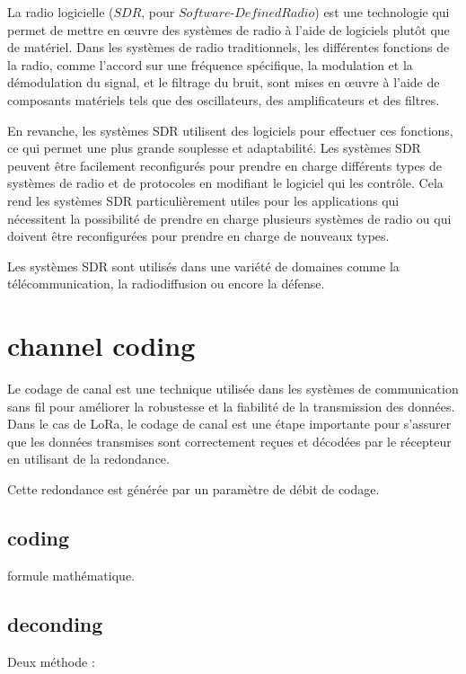 \documentclass[12pt,a4paper,oneside, titlepage]{report}
\begin{document}
La radio logicielle ($SDR$, pour $Software$-$Defined Radio$) est une technologie qui permet de mettre en œuvre des systèmes de radio à l'aide de logiciels plutôt que de matériel. Dans les systèmes de radio traditionnels, les différentes fonctions de la radio, comme l'accord sur une fréquence spécifique, la modulation et la démodulation du signal, et le filtrage du bruit, sont mises en œuvre à l'aide de composants matériels tels que des oscillateurs, des amplificateurs et des filtres.

En revanche, les systèmes SDR utilisent des logiciels pour effectuer ces fonctions, ce qui permet une plus grande souplesse et adaptabilité. Les systèmes SDR peuvent être facilement reconfigurés pour prendre en charge différents types de systèmes de radio et de protocoles en modifiant le logiciel qui les contrôle. Cela rend les systèmes SDR particulièrement utiles pour les applications qui nécessitent la possibilité de prendre en charge plusieurs systèmes de radio ou qui doivent être reconfigurées pour prendre en charge de nouveaux types.

Les systèmes SDR sont utilisés dans une variété de domaines comme  la télécommunication, la radiodiffusion ou encore la défense.



\section{channel coding}

Le codage de canal est une technique utilisée dans les systèmes de communication sans fil pour améliorer la robustesse et la fiabilité de la transmission des données. Dans le cas de LoRa, le codage de canal est une étape importante pour s'assurer que les données transmises sont correctement reçues et décodées par le récepteur en utilisant de la redondance.

Cette redondance est générée par un paramètre de débit de codage.


\subsection{coding}

formule mathématique.

\subsection{deconding}

Deux méthode :
\end{document}

